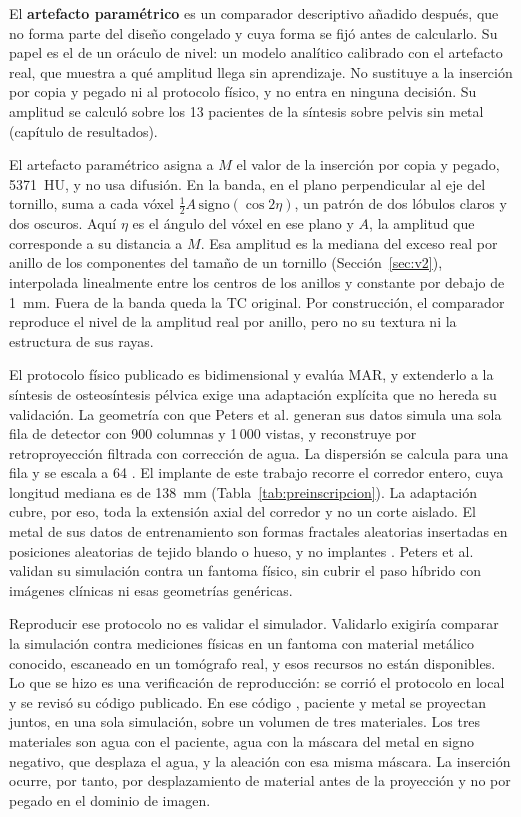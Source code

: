 El \textbf{artefacto paramétrico} es un comparador descriptivo añadido después, que no forma parte del diseño congelado y cuya forma se fijó antes de calcularlo. Su papel es el de un oráculo de nivel: un modelo analítico calibrado con el artefacto real, que muestra a qué amplitud llega sin aprendizaje. No sustituye a la inserción por copia y pegado ni al protocolo físico, y no entra en ninguna decisión. Su amplitud se calculó sobre los 13 pacientes de la síntesis sobre pelvis sin metal (capítulo de resultados).

El artefacto paramétrico asigna a $M$ el valor de la inserción por copia y pegado, 5371~HU, y no usa difusión. En la banda, en el plano perpendicular al eje del tornillo, suma a cada vóxel $\tfrac{1}{2}A\,\mathrm{signo}(\cos 2\eta)$, un patrón de dos lóbulos claros y dos oscuros. Aquí $\eta$ es el ángulo del vóxel en ese plano y $A$, la amplitud que corresponde a su distancia a $M$. Esa amplitud es la mediana del exceso real por anillo de los componentes del tamaño de un tornillo (Sección~\ref{sec:v2}), interpolada linealmente entre los centros de los anillos y constante por debajo de 1~mm. Fuera de la banda queda la TC original. Por construcción, el comparador reproduce el nivel de la amplitud real por anillo, pero no su textura ni la estructura de sus rayas.

El protocolo físico publicado es bidimensional y evalúa MAR, y extenderlo a la síntesis de osteosíntesis pélvica exige una adaptación explícita que no hereda su validación. La geometría con que Peters et al. generan sus datos simula una sola fila de detector con 900 columnas y 1\,000 vistas, y reconstruye por retroproyección filtrada con corrección de agua. La dispersión se calcula para una fila y se escala a 64 \cite{peters2025hybrid}. El implante de este trabajo recorre el corredor entero, cuya longitud mediana es de 138~mm (Tabla~\ref{tab:preinscripcion}). La adaptación cubre, por eso, toda la extensión axial del corredor y no un corte aislado. El metal de sus datos de entrenamiento son formas fractales aleatorias insertadas en posiciones aleatorias de tejido blando o hueso, y no implantes \cite{peters2025hybrid}. Peters et al. validan su simulación contra un fantoma físico, sin cubrir el paso híbrido con imágenes clínicas ni esas geometrías genéricas.

Reproducir ese protocolo no es validar el simulador. Validarlo exigiría comparar la simulación contra mediciones físicas en un fantoma con material metálico conocido, escaneado en un tomógrafo real, y esos recursos no están disponibles. Lo que se hizo es una verificación de reproducción: se corrió el protocolo en local y se revisó su código publicado. En ese código \cite{xcist2025example}, paciente y metal se proyectan juntos, en una sola simulación, sobre un volumen de tres materiales. Los tres materiales son agua con el paciente, agua con la máscara del metal en signo negativo, que desplaza el agua, y la aleación con esa misma máscara. La inserción ocurre, por tanto, por desplazamiento de material antes de la proyección y no por pegado en el dominio de imagen.

